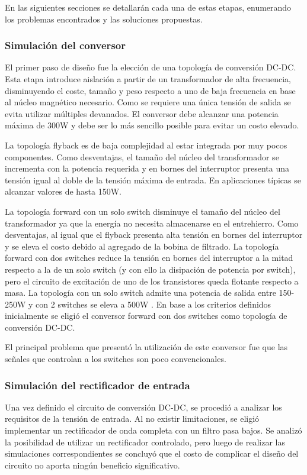 En las siguientes secciones se detallarán cada una de estas etapas,
enumerando los problemas encontrados y las soluciones propuestas.

\subsubsection{Simulación del conversor}
El primer paso de diseño fue la elección de una topología de conversión DC-DC.
Esta etapa introduce aislación a partir de un transformador de alta frecuencia,
disminuyendo el coste, tamaño y peso respecto a uno de baja frecuencia en base al núcleo magnético necesario.
Como se requiere una única tensión de salida se evita utilizar múltiples devanados.
El conversor debe alcanzar una potencia máxima de 300W y debe ser lo más sencillo posible para evitar un costo elevado. 

La topología flyback es de baja complejidad al estar integrada por muy pocos componentes. 
Como desventajas, el tamaño del núcleo del transformador se incrementa con la potencia requerida y en bornes del
interruptor presenta una tensión igual al doble de la tensión máxima de entrada.
En aplicaciones típicas se alcanzar valores de hasta 150W.

La topología forward con un solo switch disminuye el tamaño del núcleo del transformador ya que la energía no necesita almacenarse en el entrehierro.
Como desventajas, al igual que el flyback presenta alta tensión en bornes del interruptor y se eleva el costo debido al agregado de la bobina de filtrado.
La topología forward con dos switches reduce la tensión en bornes del interruptor a la mitad respecto a la de un solo switch (y con ello la disipación de potencia por switch), 
pero el circuito de excitación de uno de los transistores queda flotante respecto a masa. 
La topología con un solo switch admite una potencia de salida entre 150-250W y con 2 switches se eleva a 500W \cite{mohan}\cite{hart}. 
En base a los criterios definidos inicialmente se eligió el conversor forward con dos switches como topología de conversión DC-DC. 

El principal problema que presentó la utilización de este conversor fue que las señales que controlan a los switches son poco convencionales.

\subsubsection{Simulación del rectificador de entrada}
Una vez definido el circuito de conversión DC-DC, se procedió a analizar los requisitos de la tensión de entrada.
Al no existir limitaciones, se eligió implementar un rectificador de onda completa con un filtro pasa bajos. 
Se analizó la posibilidad de utilizar un rectificador controlado, 
pero luego de realizar las simulaciones correspondientes se concluyó que el costo de complicar el diseño del circuito no aporta ningún beneficio significativo.

